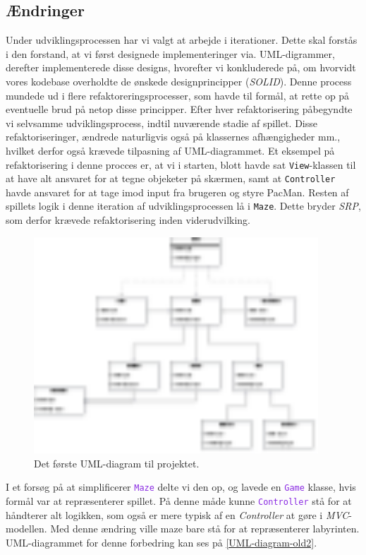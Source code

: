 \documentclass{article}
\newcommand{\code}[1]{\small\texttt{#1}}
\newcommand{\class}[1]{\textcolor{BlueViolet}{\small\texttt{#1}}}
\theoremstyle{mytheoremstyle}
\theoremstyle{mytheoremstyle}
\theoremstyle{myproblemstyle}
\begin{document}
\subsection{Ændringer}\label{sub:Ændringer} %
Under udviklingsprocessen har vi valgt at arbejde i iterationer. Dette skal forstås i den forstand, at vi først designede implementeringer via. UML-digrammer, derefter implementerede disse designs, hvorefter vi konkluderede på, om hvorvidt vores kodebase overholdte de ønskede designprincipper (\textit{SOLID}). Denne process mundede ud i flere refaktoreringsprocesser, som havde til formål, at rette op på eventuelle brud på netop disse principper. 
Efter hver refaktorisering påbegyndte vi selvsamme udviklingsprocess, indtil nuværende stadie af spillet.
Disse refaktoriseringer, ændrede naturligvis også på klassernes afhængigheder mm., hvilket derfor også krævede tilpasning af UML-diagrammet. 
Et eksempel på refaktorisering i denne procces er, at vi i starten, blott havde sat \code{View}-klassen til at have alt ansvaret for at tegne objeketer på skærmen, samt at \code{Controller} havde ansvaret for at tage imod input fra brugeren og styre PacMan. Resten af spillets logik i denne iteration af udviklingsprocessen lå i \code{Maze}. Dette bryder \textit{SRP}, som derfor krævede refaktorisering inden viderudvilking.


\begin{figure}[H]
    \begin{center}
        \includegraphics[width=0.95\textwidth]{figures/UML-diagram-old.png}
    \end{center}
    \caption{Det første UML-diagram til projektet.}
    \label{UML-diagram-old}
\end{figure}
I et forsøg på at simplificerer \class{Maze} delte vi den op, og lavede en
\class{Game} klasse, hvis formål var at repræsenterer spillet. På denne måde
kunne \class{Controller} stå for at håndterer alt logikken, som også er mere
typisk af en \textit{Controller} at gøre i \textit{MVC}-modellen. Med denne
ændring ville maze bare stå for at repræsenterer labyrinten. UML-diagrammet for
denne forbedring kan ses på \autoref{UML-diagram-old2}.
\end{document}
